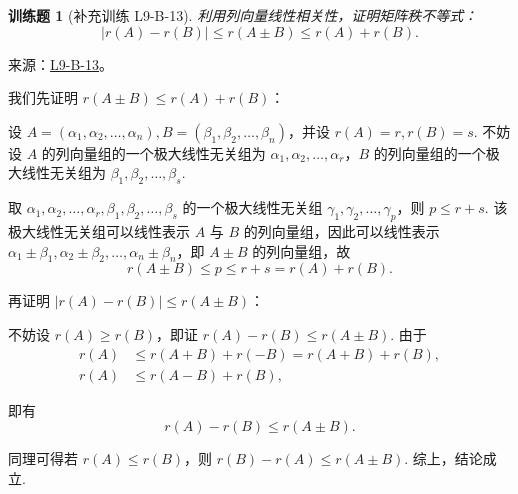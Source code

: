 \documentclass[UTF8,12pt,a4paper,fontset=fandol]{ctexart}
\newtheorem{exercise}{训练题}[section]
\begin{document}
\begin{exercise}[补充训练 L9-B-13]\label{prob:L9-B-13}
利用列向量线性相关性，证明矩阵秩不等式：\[|r(A)-r(B)|\leqslant r(A\pm B) \leqslant r(A)+r(B).\]
\end{exercise}
\noindent 来源：\href{https://github.com/yhwu-is/Linear-Algebra-Left-Undone/blob/new/%E8%AE%B2%E4%B9%89/%E4%B8%93%E9%A2%98/9%20%E7%9F%A9%E9%98%B5%E8%BF%90%E7%AE%97%E8%BF%9B%E9%98%B6.tex}{L9-B-13}。
\begin{solve}
我们先证明 $r(A \pm B) \leqslant r(A)+r(B)$：

            设 $A = (\alpha_1, \alpha_2, \ldots, \alpha_n), B = (\beta_1, \beta_2, \ldots, \beta_n)$，并设 $r(A) = r, r(B) = s$. 不妨设 $A$ 的列向量组的一个极大线性无关组为 $\alpha_1, \alpha_2, \ldots, \alpha_r$，$B$ 的列向量组的一个极大线性无关组为 $\beta_1, \beta_2, \ldots, \beta_s$.

            取 $\alpha_1, \alpha_2, \ldots, \alpha_r, \beta_1, \beta_2, \ldots, \beta_s$ 的一个极大线性无关组 $\gamma_1, \gamma_2, \ldots, \gamma_p$，则 $p \leqslant r+s$. 该极大线性无关组可以线性表示 $A$ 与 $B$ 的列向量组，因此可以线性表示 $\alpha_1 \pm \beta_1, \alpha_2 \pm \beta_2, \ldots, \alpha_n \pm \beta_n$，即 $A \pm B$ 的列向量组，故
            \[
                r(A \pm B) \leqslant p \leqslant r+s = r(A) + r(B).
            \]

            再证明 $|r(A) - r(B)| \leqslant r(A \pm B)$：

            不妨设 $r(A) \geqslant r(B)$，即证 $r(A) - r(B) \leqslant r(A \pm B)$. 由于
            \begin{align*}
                r(A) &\leqslant r(A + B) + r(-B) = r(A + B) + r(B), \\
                r(A) &\leqslant r(A - B) + r(B),
            \end{align*}

            即有
            \[
                r(A) - r(B) \leqslant r(A \pm B).
            \]

            同理可得若 $r(A) \leqslant r(B)$，则 $r(B) - r(A) \leqslant r(A \pm B)$. 综上，结论成立.
\end{solve}
\end{document}
